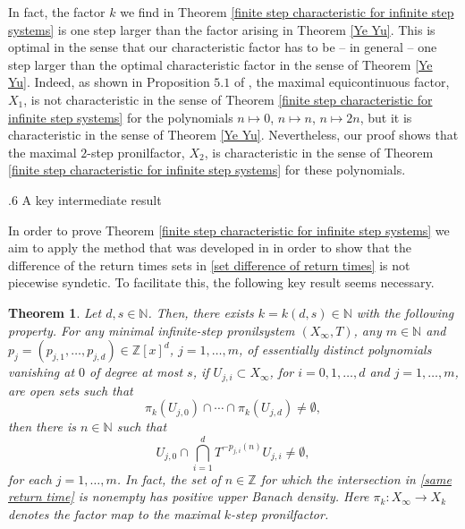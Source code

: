 \documentclass[reqno]{amsart}
\makeatletter
\def\Z{{\mathbb Z}}
\def\N{{\mathbb N}}
\newtheorem{theorem}{Theorem}[section]
\theoremstyle{definition}
\def\subsection{\@startsection{subsection}{2}%
  \z@{.4\linespacing\@plus.7\linespacing}
{.6\baselineskip}%
  {\normalfont\centering\bfseries}%
}
\theoremstyle{remark}
\def\N{{\mathbb N}}
\makeatother
\begin{document}
In fact, the factor $k$ we find in Theorem \ref{finite step characteristic for infinite step systems} is one step larger than the factor arising in Theorem \ref{Ye Yu}. This is optimal in the sense that our characteristic factor has to be -- in general -- one step larger than the optimal characteristic factor in the sense of Theorem \ref{Ye Yu}. Indeed, as shown in Proposition $5.1$ of \cite{GKLMRR}, the maximal equicontinuous factor, $X_1$, is not characteristic in the sense of Theorem \ref{finite step characteristic for infinite step systems} for the polynomials $n\mapsto 0$, $n\mapsto n$, $n\mapsto 2n$, but it is characteristic in the sense of Theorem \ref{Ye Yu}. Nevertheless, our proof shows that the maximal $2$-step pronilfactor, $X_2$, is characteristic in the sense of Theorem \ref{finite step characteristic for infinite step systems} for these polynomials.

\subsection{A key intermediate result}\label{key result} 

In order to prove Theorem 
\ref{finite step characteristic for infinite step systems} we 
aim to apply the method that was developed in \cite{GKLMRR} 
in order to show that the 
difference of the return times sets in \eqref{set difference of return times} is not piecewise syndetic. To 
facilitate this, the following key result seems necessary. 

\begin{theorem}\label{k factor is characteristic}
Let $d,s\in \N$. Then, there exists $k=k(d,s)\in \N$ with 
the following property. For any minimal infinite-step 
pronilsystem $(X_{\infty},T)$, any $m\in \N$ and $p_j=(p_{j,1},\ldots,p_{j,d})\in \Z[x]^{d}$, $j=1,\ldots,m$, 
of essentially distinct 
polynomials vanishing at $0$ of degree at most $s$, if $U_{j,i}\subset X_{\infty}$, for $i=0,1,\ldots,d$ and 
$j=1,\ldots,m$, are open sets such that 
$$\pi_k(U_{j,0}) \cap \cdots \cap \pi_k(U_{j,d}) \neq \emptyset, $$
then there is $n\in \N$ such that 
\begin{equation}\label{same return time}
U_{j,0} \cap \bigcap_{i=1}^d T^{-p_{j,i}(n)}U_{j,i} \neq \emptyset,    
\end{equation}
for each $j=1,\ldots,m$.
In fact, the set of $n\in \Z$ for which the intersection in \eqref{same return time} is 
nonempty has positive upper Banach density. Here $\pi_k:X_{\infty}\to X_k$ denotes the factor map to the maximal $k$-step pronilfactor.
\end{theorem}
\end{document}

